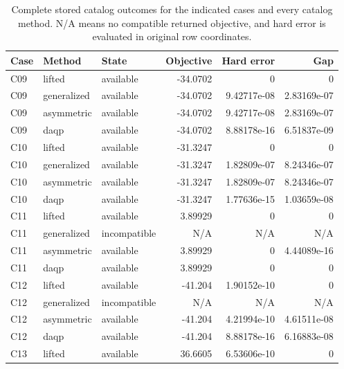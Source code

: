 \begin{table}[htbp]\centering\footnotesize
\caption{Complete stored catalog outcomes for the indicated cases and every catalog method. N/A means no compatible returned objective, and hard error is evaluated in original row coordinates.}\label{tab:catalog-2}
\begin{tabularx}{\textwidth}{@{}ll>{\raggedright\arraybackslash}Xrrr@{}}\toprule
Case & Method & State & Objective & Hard error & Gap\\\midrule
C09 & lifted & available & -34.\allowbreak{}0702 & 0 & 0\\
C09 & generalized & available & -34.\allowbreak{}0702 & 9.\allowbreak{}42717e-08 & 2.\allowbreak{}83169e-07\\
C09 & asymmetric & available & -34.\allowbreak{}0702 & 9.\allowbreak{}42717e-08 & 2.\allowbreak{}83169e-07\\
C09 & daqp & available & -34.\allowbreak{}0702 & 8.\allowbreak{}88178e-16 & 6.\allowbreak{}51837e-09\\
C10 & lifted & available & -31.\allowbreak{}3247 & 0 & 0\\
C10 & generalized & available & -31.\allowbreak{}3247 & 1.\allowbreak{}82809e-07 & 8.\allowbreak{}24346e-07\\
C10 & asymmetric & available & -31.\allowbreak{}3247 & 1.\allowbreak{}82809e-07 & 8.\allowbreak{}24346e-07\\
C10 & daqp & available & -31.\allowbreak{}3247 & 1.\allowbreak{}77636e-15 & 1.\allowbreak{}03659e-08\\
C11 & lifted & available & 3.\allowbreak{}89929 & 0 & 0\\
C11 & generalized & incompatible & N/\allowbreak{}A & N/\allowbreak{}A & N/\allowbreak{}A\\
C11 & asymmetric & available & 3.\allowbreak{}89929 & 0 & 4.\allowbreak{}44089e-16\\
C11 & daqp & available & 3.\allowbreak{}89929 & 0 & 0\\
C12 & lifted & available & -41.\allowbreak{}204 & 1.\allowbreak{}90152e-10 & 0\\
C12 & generalized & incompatible & N/\allowbreak{}A & N/\allowbreak{}A & N/\allowbreak{}A\\
C12 & asymmetric & available & -41.\allowbreak{}204 & 4.\allowbreak{}21994e-10 & 4.\allowbreak{}61511e-08\\
C12 & daqp & available & -41.\allowbreak{}204 & 8.\allowbreak{}88178e-16 & 6.\allowbreak{}16883e-08\\
C13 & lifted & available & 36.\allowbreak{}6605 & 6.\allowbreak{}53606e-10 & 0\\

\end{tabularx}
\end{table}
